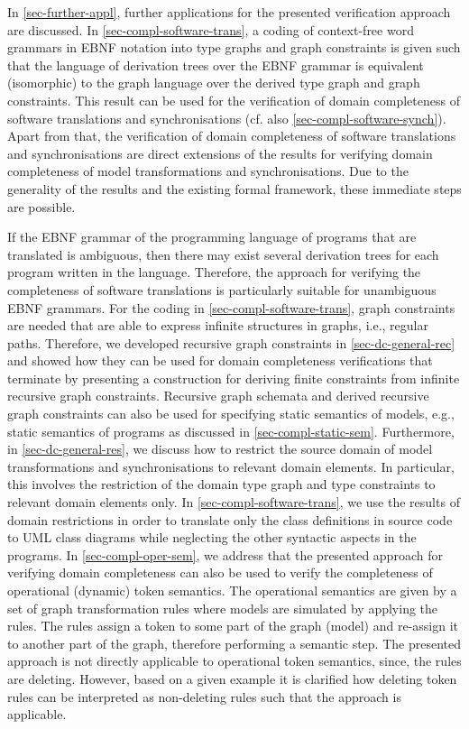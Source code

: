 In \cref{sec-further-appl}, further applications for the presented verification approach are discussed.
In \cref{sec-compl-software-trans}, a coding of context-free word grammars in EBNF notation into type graphs and graph constraints is given such that the language of derivation trees over the EBNF grammar is equivalent (isomorphic) to the graph language over the derived type graph and graph constraints.
This result can be used for the verification of domain completeness of software translations and synchronisations (cf. also \cref{sec-compl-software-synch}).
Apart from that, the verification of domain completeness of software translations and synchronisations are direct extensions of the results for verifying domain completeness of model transformations and synchronisations.
Due to the generality of the results and the existing formal framework, these immediate steps are possible.

If the EBNF grammar of the programming language of programs that are translated is ambiguous, then there may exist several derivation trees for each program written in the language.
Therefore, the approach for verifying the completeness of software translations is particularly suitable for unambiguous EBNF grammars.
%
For the coding in \cref{sec-compl-software-trans}, graph constraints are needed that are able to express infinite structures in graphs, i.e., regular paths.
Therefore, we developed recursive graph constraints in \cref{sec-dc-general-rec} and showed how they can be used for domain completeness verifications that terminate by presenting a construction for deriving finite constraints from infinite recursive graph constraints.
Recursive graph schemata and derived recursive graph constraints can also be used for specifying static semantics of models, e.g., static semantics of programs as discussed in \cref{sec-compl-static-sem}.
%
Furthermore, in \cref{sec-dc-general-res}, we discuss how to restrict the source domain of model transformations and synchronisations to relevant domain elements.
In particular, this involves the restriction of the domain type graph and type constraints to relevant domain elements only.
%
In \cref{sec-compl-software-trans}, we use the results of domain restrictions in order to translate only the class definitions in source code to UML class diagrams while neglecting the other syntactic aspects in the programs.
%
In \cref{sec-compl-oper-sem}, we address that the presented approach for verifying domain completeness can also be used to verify the completeness of operational (dynamic) token semantics.
The operational semantics are given by a set of graph transformation rules where models are simulated by applying the rules.
The rules assign a token to some part of the graph (model) and re-assign it to another part of the graph, therefore performing a semantic step.
The presented approach is not directly applicable to operational token semantics, since, the rules are deleting.
However, based on a given example it is clarified how deleting token rules can be interpreted as non-deleting rules such that the approach is applicable.

